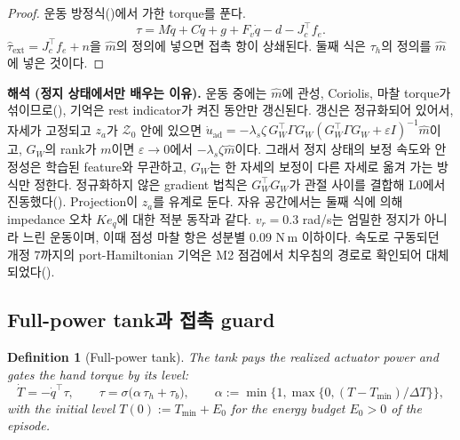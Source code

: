 \documentclass[11pt]{article}\usepackage[margin=1in]{geometry}\usepackage{amsmath,amssymb,amsthm,mathtools}\usepackage{graphicx}\graphicspath{{figures/}{../figures/}{figs/}{./}}\usepackage{enumitem}\usepackage{hyperref}\usepackage{cleveref}\usepackage{tikz}\usetikzlibrary{arrows.meta,positioning,calc,shapes.geometric}\usepackage{float}\usepackage{rotating}\usepackage[most]{tcolorbox}\usepackage{kotex}\usepackage{booktabs}\usepackage{longtable}\emergencystretch=1.6em\tolerance=2000 \crefname{assumption}{Assumption}{Assumptions}\Crefname{assumption}{Assumption}{Assumptions}\crefname{definition}{Definition}{Definitions}\Crefname{definition}{Definition}{Definitions}\crefname{proposition}{Proposition}{Propositions}\Crefname{proposition}{Proposition}{Propositions}\crefname{fact}{Fact}{Facts}\Crefname{fact}{Fact}{Facts} \newtheorem{assumption}{Assumption}\newtheorem{definition}{Definition}\newtheorem{lemma}{Lemma}\newtheorem{proposition}{Proposition}\newtheorem{theorem}{Theorem}\newtheorem{corollary}{Corollary}\newtheorem{fact}{Fact}\theoremstyle{remark}\newtheorem{remark}{Remark} \newcommand{\R}{\mathbb{R}}\newcommand{\xb}{\bar x}\newcommand{\Ab}{\bar A}\newcommand{\By}{\bar B_y}\newcommand{\U}{\mathcal U}\newcommand{\Z}{\mathcal Z}
\begin{document}
\begin{proof}
운동 방정식()에서 가한 torque를 푼다.
\[
\tau=M\ddot q+C\dot q+g+F_v\dot q-d-J_c^\top f_e .
\]
$\hat\tau_{\mathrm{ext}}=J_c^\top f_e+n$을 $\hat m$의 정의에 넣으면 접촉 항이 상쇄된다. 둘째 식은 $\tau_h$의 정의를 $\hat m$에 넣은 것이다.
\end{proof}

\textbf{해석 (정지 상태에서만 배우는 이유).} 운동 중에는 $\hat m$에 관성, Coriolis, 마찰 torque가 섞이므로(), 기억은 rest indicator가 켜진 동안만 갱신된다. 갱신은 정규화되어 있어서, 자세가 고정되고 $z_a$가 $\mathcal Z_0$ 안에 있으면 $\dot u_{\mathrm{ad}}=-\lambda_s\zeta\,G_W^\top\Gamma G_W(G_W^\top\Gamma G_W+\varepsilon I)^{-1}\hat m$이고, $G_W$의 rank가 $m$이면 $\varepsilon\to0$에서 $-\lambda_s\zeta\hat m$이다. 그래서 정지 상태의 보정 속도와 안정성은 학습된 feature와 무관하고, $G_W$는 한 자세의 보정이 다른 자세로 옮겨 가는 방식만 정한다. 정규화하지 않은 gradient 법칙은 $G_W^\top G_W$가 관절 사이를 결합해 L0에서 진동했다(). Projection이 $z_a$를 유계로 둔다. 자유 공간에서는 둘째 식에 의해 impedance 오차 $Ke_q$에 대한 적분 동작과 같다. $v_r=0.3$ rad/s는 엄밀한 정지가 아니라 느린 운동이며, 이때 점성 마찰 항은 성분별 0.09 N\,m 이하이다. 속도로 구동되던 개정 7까지의 port-Hamiltonian 기억은 M2 점검에서 치우침의 경로로 확인되어 대체되었다().

\subsection{Full-power tank과 접촉 guard}
\label{sec:tank3}

\begin{definition}[Full-power tank]
\label{def:fulltank}
The tank pays the realized actuator power and gates the hand torque by its level:
\[
\dot T=-\dot q^\top\tau,\qquad \tau=\sigma\big(\alpha\,\tau_h+\tau_b\big),\qquad \alpha:=\min\big\{1,\max\{0,(T-T_{\min})/\Delta T\}\big\},
\]
with the initial level $T(0):=T_{\min}+E_0$ for the energy budget $E_0>0$ of the episode.
\end{definition}
\end{document}
